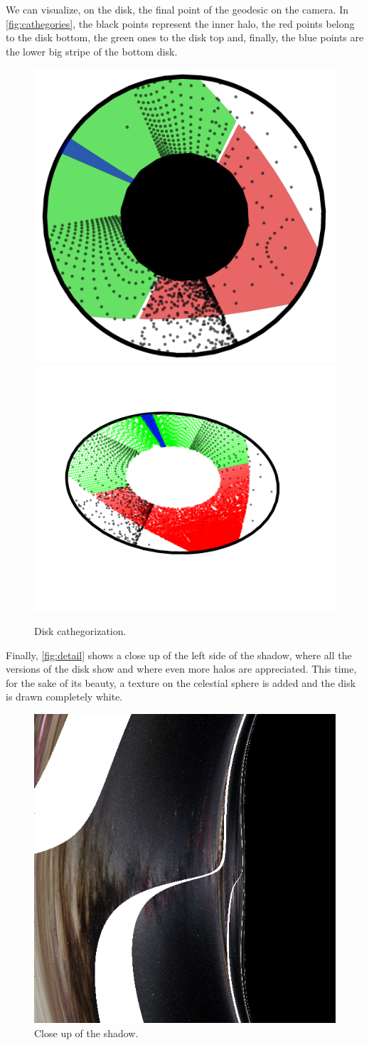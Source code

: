We can visualize, on the disk, the final point of the geodesic on the camera. In \autoref{fig:cathegories}, the black points represent the inner halo, the red points belong to the disk bottom, the green ones to the disk top and, finally, the blue points are the lower big stripe of the bottom disk.

\begin{figure}[bth]
	\myfloatalign
	{\includegraphics[width=.45\linewidth]{gfx/disk_cathegorization}} \quad
	{\includegraphics[width=.45\linewidth]{gfx/disk_cathegorization2}}
	\caption[Disk cathegorization.]{Disk cathegorization.}
	\label{fig:cathegories}
\end{figure}

Finally, \autoref{fig:detail} shows a close up of the left side of the shadow, where all the versions of the disk show and where even more halos are appreciated. This time, for the sake of its beauty, a texture on the celestial sphere is added and the disk is drawn completely white.

\begin{figure}[bth]
	\myfloatalign
	\includegraphics[width=.7\linewidth]{gfx/bh_detail_texture_disk-white}
	\caption[Close up of the shadow.]{Close up of the shadow.}
	\label{fig:detail}
\end{figure}


